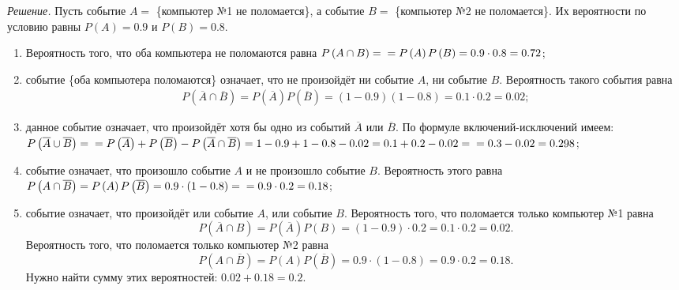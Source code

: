 \textit{Решение.} Пусть событие $A =$ \{компьютер №1 не поломается\}, а событие $B =$ \{компьютер №2 не поломается\}.
Их вероятности по условию равны $P \left( A \right) = 0.9$ и $P \left( B \right) = 0.8$.
\begin{enumerate}[label=\alph*)]
\item Вероятность того, что оба компьютера не поломаются равна
$P \left( A \cap B \right) = \\
= P \left( A \right) P \left( B \right) =
0.9 \cdot 0.8 =
0.72$;
\item событие \{оба компьютера поломаются\} означает, что не произойдёт ни событие $A$, ни событие $B$.
Вероятность такого события равна
\begin{equation*}
\begin{split}
P \left( \overline{A} \cap \overline{B} \right) =
P \left( \overline{A} \right) P \left( \overline{B} \right) =
\left( 1 - 0.9 \right) \left( 1 - 0.8 \right) =
0.1 \cdot 0.2 =
0.02;
\end{split}
\end{equation*} 
\item данное событие означает, что произойдёт хотя бы одно из событий $\overline{A}$ или $ \overline{B}$.
По формуле включений-исключений имеем:
$P \left( \overline{A} \cup \overline{B} \right) = \\
= P \left( \overline{A} \right) + P \left( \overline{B} \right) - P \left( \overline{A} \cap \overline{B} \right) =
1 - 0.9 + 1 - 0.8 - 0.02 =
0.1 + 0.2 - 0.02 = \\
= 0.3 - 0.02 =
0.298$;
\item событие означает, что произошло событие $A$ и не произошло событие $B$.
Вероятность этого равна
$P \left( A \cap \overline{B} \right) =
P \left( A \right) P \left( \overline{B} \right) =
0.9 \cdot \left( 1 - 0.8 \right) = \\
= 0.9 \cdot 0.2 =
0.18$;
\item событие означает, что произойдёт или событие $A$, или событие $B$.
Вероятность того, что поломается только компьютер №1 равна
$$P \left( \overline{A} \cap B \right) =
P \left( \overline{A} \right) P \left( B \right) =
\left( 1 - 0.9 \right) \cdot 0.2 =
0.1 \cdot 0.2 =
0.02.$$
Вероятность того, что поломается только компьютер №2 равна
$$P \left( A \cap \overline{B} \right) =
P \left( A \right) P \left( \overline{B} \right) =
0.9 \cdot \left( 1 - 0.8 \right) =
0.9 \cdot 0.2 =
0.18.$$
Нужно найти сумму этих вероятностей: $0.02 + 0.18 = 0.2$.
\end{enumerate}

